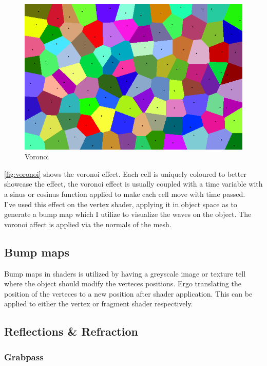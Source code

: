 \documentclass{article}
\begin{document}
\begin{figure}[H]
    \centering
    \includegraphics[width=.75\textwidth]{img/voronoi}
    \caption{Voronoi\protect\footnotemark}
    \label{fig:voronoi}
\end{figure}
\autoref{fig:voronoi} shows the voronoi effect. Each cell is uniquely coloured to better showcase the effect, the voronoi effect is usually coupled with a time variable with a sinus or cosinus function applied to make each cell move with time passed.\\

I've used this effect on the vertex shader, applying it in object space as to generate a bump map which I utilize to visualize the waves on the object. The voronoi affect is applied via the normals of the mesh.

\subsection{Bump maps}
\label{sec:bump_map}
Bump maps in shaders is utilized by having a greyscale image or texture tell where the object should modify the verteces positions. Ergo translating the position of the verteces to a new position after shader application. This can be applied to either the vertex or fragment shader respectively.

\subsection{Reflections \& Refraction}
\label{sec:refl_refr}

\subsubsection{Grabpass}
\label{sec:grabpass}
\end{document}
